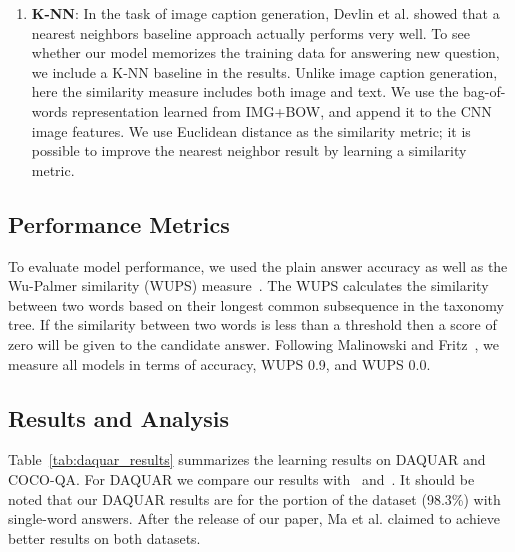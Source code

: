 \documentclass{article} \usepackage{nips15submit_e,times}
\renewcommand{\#}[1]{\textbf{#1}}
\begin{document}
\begin{enumerate}[leftmargin=*]
\item \#{K-NN}: In the task of image caption generation, Devlin et al.
\cite{devlin15} showed that a nearest neighbors baseline approach actually
performs very well. To see whether our model memorizes the training data for
answering new question, we include a K-NN baseline in the results. Unlike
image caption generation, here the similarity measure includes both image
and text.  We use the bag-of-words representation learned from IMG+BOW, and
append it to the CNN image features.  We use Euclidean distance as the
similarity metric; it is possible to improve the nearest neighbor result by 
learning a similarity metric.
\end{enumerate}


\subsection{Performance Metrics}
To evaluate model performance, we used the plain answer accuracy as well as the
Wu-Palmer similarity (WUPS) measure~\cite{wu94, malinowski14b}. The WUPS
calculates the similarity between two words based on their longest common
subsequence in the taxonomy tree. If the similarity between two words is less
than a threshold then a score of zero will be given to the candidate answer.
Following Malinowski and Fritz~\cite{malinowski14b}, we measure all models
in terms of accuracy, WUPS 0.9, and WUPS 0.0.

\subsection{Results and Analysis}
Table~\ref{tab:daquar_results} summarizes the learning results on DAQUAR
and COCO-QA. For DAQUAR
we compare our results with~\cite{malinowski14b} and~\cite{malinowski15}. It
should be noted that our DAQUAR results are for the portion of the dataset (98.3\%)
with single-word answers. After the release of our paper, Ma et al. \cite{ma15}
claimed to achieve better results on both datasets.
\end{document}
